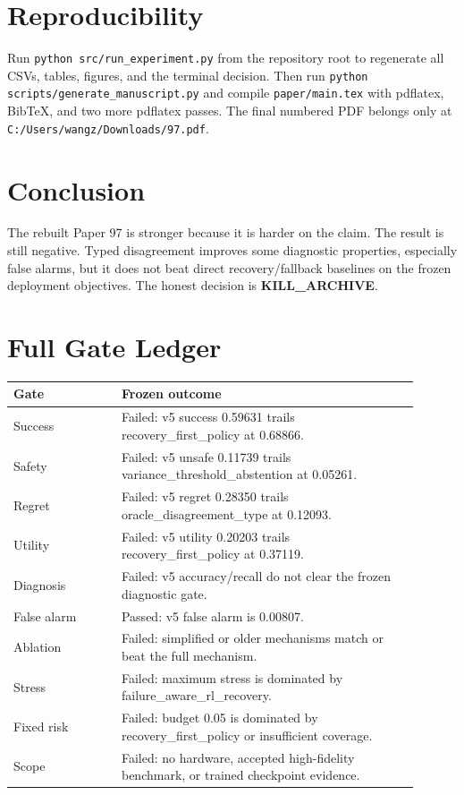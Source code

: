 \documentclass[11pt]{article}
\newcommand{\method}[1]{\texttt{#1}}
\begin{document}
\section{Reproducibility}
Run \method{python src/run\_experiment.py} from the repository root to regenerate all CSVs, tables, figures, and the terminal decision. Then run \method{python scripts/generate\_manuscript.py} and compile \method{paper/main.tex} with pdflatex, BibTeX, and two more pdflatex passes. The final numbered PDF belongs only at \method{C:/Users/wangz/Downloads/97.pdf}.

\section{Conclusion}
The rebuilt Paper 97 is stronger because it is harder on the claim. The result is still negative. Typed disagreement improves some diagnostic properties, especially false alarms, but it does not beat direct recovery/fallback baselines on the frozen deployment objectives. The honest decision is \textbf{KILL\_ARCHIVE}.

\clearpage
\appendix
\section{Full Gate Ledger}
\begin{longtable}{p{0.24\linewidth}p{0.66\linewidth}}
\toprule
Gate & Frozen outcome \\
\midrule
Success & Failed: v5 success 0.59631 trails recovery\_first\_policy at 0.68866. \\
Safety & Failed: v5 unsafe 0.11739 trails variance\_threshold\_abstention at 0.05261. \\
Regret & Failed: v5 regret 0.28350 trails oracle\_disagreement\_type at 0.12093. \\
Utility & Failed: v5 utility 0.20203 trails recovery\_first\_policy at 0.37119. \\
Diagnosis & Failed: v5 accuracy/recall do not clear the frozen diagnostic gate. \\
False alarm & Passed: v5 false alarm is 0.00807. \\
Ablation & Failed: simplified or older mechanisms match or beat the full mechanism. \\
Stress & Failed: maximum stress is dominated by failure\_aware\_rl\_recovery. \\
Fixed risk & Failed: budget 0.05 is dominated by recovery\_first\_policy or insufficient coverage. \\
Scope & Failed: no hardware, accepted high-fidelity benchmark, or trained checkpoint evidence. \\
\bottomrule
\end{longtable}
\end{document}
